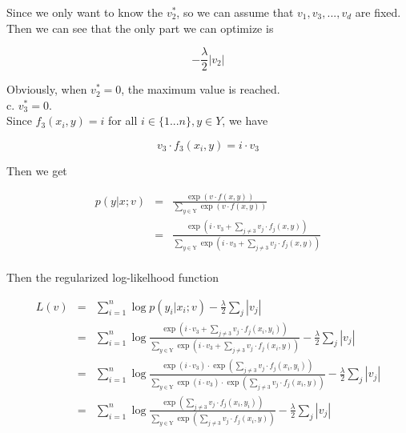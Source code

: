 \documentclass[12pt]{article}
\begin{document}
Since we only want to know the $v_2^*$, so we can assume that
$v_1, v_3,...,v_d$ are fixed. Then we can see that the only part
we can optimize is

\begin{equation*}
- \frac {\lambda}{2} |v_2|
\end{equation*}

Obviously, when $v^*_2 = 0$, the maximum value is reached. \\

c. $v^*_3 = 0$. \\

Since $f_3(x_i,y) = i$  for all $i \in \{1...n\}, y \in Y$, we
have

\begin{equation*}
v_3 \cdot f_3(x_i,y) = i \cdot v_3
\end{equation*}

Then we get

\begin{eqnarray*}
p(y|x;v)
&=& \frac {\exp {(v \cdot f(x,y))}}
{\sum_{y \in \mathrm{Y}} {\exp {(v \cdot f(x,y))}}} \\
&=& \frac {\exp {(i \cdot v_3 + \sum_{j \neq 3} {v_j \cdot f_j(x,y)})}}
 {\sum_{y \in \mathrm{Y}} {\exp {(i \cdot v_3 + \sum_{j \neq 3} {v_j \cdot
         f_j(x,y)})}}} \\
\end{eqnarray*}

Then the regularized log-likelhood function

\begin{eqnarray*}
L(v)
&=& \sum_{i=1}^n {\log {p(y_i|x_i;v)}} - \frac {\lambda}{2} \sum_j
{|v_j|} \\
&=& \sum_{i=1}^n {\log {\frac {\exp {(i \cdot v_3 + \sum_{j \neq 3} {v_j \cdot
        f_j(x_i,y_i)})}} {\sum_{y \in \mathrm{Y}} {\exp {(i \cdot v_3 + \sum_{j
          \neq 3} {v_j \cdot f_j(x_i,y)})}}}}} - \frac {\lambda}{2}
\sum_j {|v_j|} \\
&=& \sum_{i=1}^n {\log {\frac {\exp {(i \cdot v_3)} \cdot \exp {(\sum_{j
          \neq 3} {v_j \cdot f_j(x_i,y_i)})}} {\sum_{y \in \mathrm{Y}}
      {\exp {(i \cdot v_3)} \cdot \exp {(\sum_{j \neq 3} {v_j \cdot
            f_j(x_i,y)})}}}}} - \frac {\lambda}{2} \sum_j {|v_j|} \\
&=& \sum_{i=1}^n {\log {\frac {\exp {(\sum_{j \neq 3} {v_j \cdot
          f_j(x_i,y_i)})}} {\sum_{y \in \mathrm{Y}} {\exp {(\sum_{j
            \neq 3} {v_j \cdot f_j(x_i,y)})}}}}} - \frac {\lambda}{2}
\sum_j {|v_j|}
\end{eqnarray*}
\end{document}
